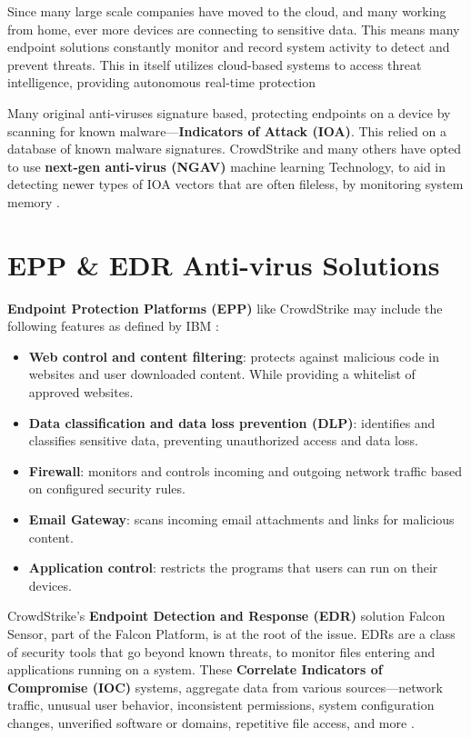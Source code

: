 Since many large scale companies have moved to the cloud, and many working from home, ever more devices are connecting to sensitive data. This means many endpoint solutions 
constantly monitor and record system activity to detect and prevent threats. This in itself utilizes cloud-based systems to access threat intelligence, providing autonomous 
real-time protection \cite{cisco_endpoint_security}

Many original anti-viruses signature based, protecting endpoints on a device by scanning for known malware---\textbf{Indicators of Attack (IOA)}. 
This relied on a database of known malware signatures. CrowdStrike and many others
have opted to use \textbf{next-gen anti-virus (NGAV)} machine learning Technology,
to aid in detecting newer types of IOA vectors that are often fileless, by monitoring system memory  \cite{ionescu_kernel_access_2024}.

\newpage

\section{EPP \& EDR Anti-virus Solutions}
\textbf{Endpoint Protection Platforms (EPP)} like CrowdStrike may include the following features as defined by IBM \cite{ibm_endpoint_security}:
\begin{itemize}
    \item \textbf{Web control and content filtering}: protects against malicious code in websites and 
    user downloaded content. While providing a whitelist of approved websites.
    \item \textbf{Data classification and data loss prevention (DLP)}: identifies and classifies sensitive data, 
    preventing unauthorized access and data loss.
    \item \textbf{Firewall}: monitors and controls incoming and outgoing network traffic based on configured security rules.
    \item \textbf{Email Gateway}: scans incoming email attachments and links for malicious content.
    \item \textbf{Application control}: restricts the programs that users can run on their devices.
\end{itemize}

CrowdStrike's \textbf{Endpoint Detection and Response (EDR)} solution Falcon Sensor, part of the Falcon Platform, is at the root of the issue.
EDRs are a class of security tools that go beyond known threats, to monitor files entering and applications running on a system.
These \textbf{Correlate Indicators of Compromise (IOC)} systems, aggregate data from various sources---network traffic, unusual user behavior,
inconsistent permissions, system configuration changes, unverified software or domains, repetitive file access, and more \cite{microsoft_ioc}.


